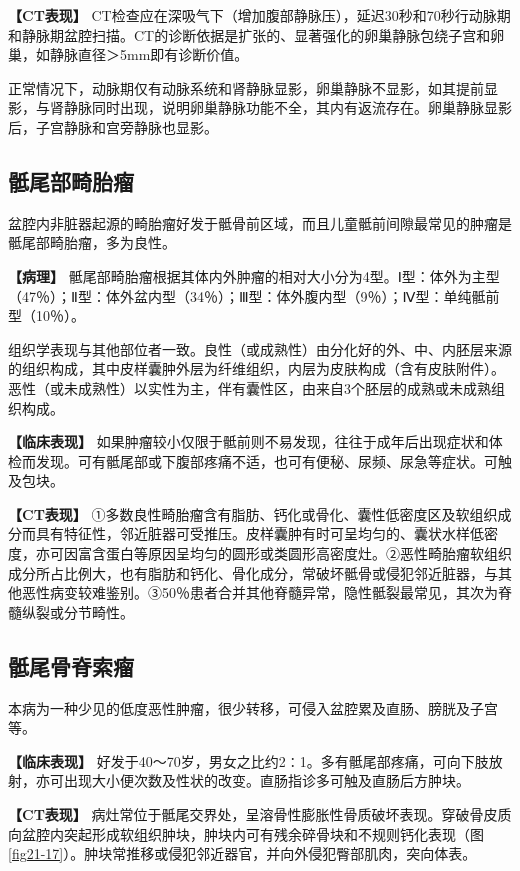 \textbf{【CT表现】}
CT检查应在深吸气下（增加腹部静脉压），延迟30秒和70秒行动脉期和静脉期盆腔扫描。CT的诊断依据是扩张的、显著强化的卵巢静脉包绕子宫和卵巢，如静脉直径＞5mm即有诊断价值。

正常情况下，动脉期仅有动脉系统和肾静脉显影，卵巢静脉不显影，如其提前显影，与肾静脉同时出现，说明卵巢静脉功能不全，其内有返流存在。卵巢静脉显影后，子宫静脉和宫旁静脉也显影。

\subsection{骶尾部畸胎瘤}

盆腔内非脏器起源的畸胎瘤好发于骶骨前区域，而且儿童骶前间隙最常见的肿瘤是骶尾部畸胎瘤，多为良性。

\textbf{【病理】}
骶尾部畸胎瘤根据其体内外肿瘤的相对大小分为4型。Ⅰ型：体外为主型（47％）；Ⅱ型：体外盆内型（34％）；Ⅲ型：体外腹内型（9％）；Ⅳ型：单纯骶前型（10％）。

组织学表现与其他部位者一致。良性（或成熟性）由分化好的外、中、内胚层来源的组织构成，其中皮样囊肿外层为纤维组织，内层为皮肤构成（含有皮肤附件）。恶性（或未成熟性）以实性为主，伴有囊性区，由来自3个胚层的成熟或未成熟组织构成。

\textbf{【临床表现】}
如果肿瘤较小仅限于骶前则不易发现，往往于成年后出现症状和体检而发现。可有骶尾部或下腹部疼痛不适，也可有便秘、尿频、尿急等症状。可触及包块。

\textbf{【CT表现】}
①多数良性畸胎瘤含有脂肪、钙化或骨化、囊性低密度区及软组织成分而具有特征性，邻近脏器可受推压。皮样囊肿有时可呈均匀的、囊状水样低密度，亦可因富含蛋白等原因呈均匀的圆形或类圆形高密度灶。②恶性畸胎瘤软组织成分所占比例大，也有脂肪和钙化、骨化成分，常破坏骶骨或侵犯邻近脏器，与其他恶性病变较难鉴别。③50％患者合并其他脊髓异常，隐性骶裂最常见，其次为脊髓纵裂或分节畸性。

\subsection{骶尾骨脊索瘤}

本病为一种少见的低度恶性肿瘤，很少转移，可侵入盆腔累及直肠、膀胱及子宫等。

\textbf{【临床表现】}
好发于40～70岁，男女之比约2∶1。多有骶尾部疼痛，可向下肢放射，亦可出现大小便次数及性状的改变。直肠指诊多可触及直肠后方肿块。

\textbf{【CT表现】}
病灶常位于骶尾交界处，呈溶骨性膨胀性骨质破坏表现。穿破骨皮质向盆腔内突起形成软组织肿块，肿块内可有残余碎骨块和不规则钙化表现（图\ref{fig21-17}）。肿块常推移或侵犯邻近器官，并向外侵犯臀部肌肉，突向体表。

